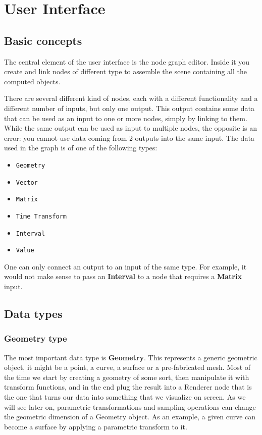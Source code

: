 \chapter{User Interface}

\section{Basic concepts}
The central element of the user interface is the node graph editor. Inside it
you create and link nodes of different type to assemble the scene containing all
the computed objects.

There are several different kind of nodes, each with a different functionality
and a different number of inputs, but only one output. This output contains
some data that can be used as an input to one or more nodes, simply by
linking to them. While the same output can be used as input to multiple nodes,
the opposite is an error: you cannot use data coming from 2 outputs into the same input.
The data used in the graph is of one of the following types:

\begin{itemize}
    \item \texttt{Geometry}
    \item \texttt{Vector}
    \item \texttt{Matrix}
    \item \texttt{Time Transform}
    \item \texttt{Interval}
    \item \texttt{Value}
\end{itemize}

One can only connect an output to an input of the same type. For example, it
would not make sense to pass an \textbf{Interval} to a node that requires
a \textbf{Matrix} input.

\section{Data types}
\subsection{Geometry type}
The most important data type is \textbf{Geometry}. This represents a generic geometric
object, it might be a point, a curve, a surface or a pre-fabricated mesh.
Most of the time we start by creating a geometry of some sort, then
manipulate it with transform functions, and in the end plug the result
into a Renderer node that is the one that turns our data into something
that we visualize on screen.
As we will see later on, parametric transformations and sampling operations
can change the geometric dimension of a Geometry object. As an example,
a given curve can become a surface by applying a parametric transform to it.

